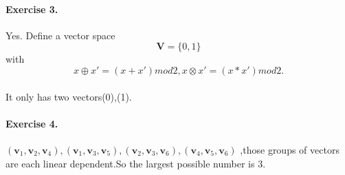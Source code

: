 \documentclass{article}
\begin{document}
  
  \paragraph{Exercise 3.} Yes.
  Define a vector space \[\mathbf{V} = \{0,1\} \] with  \[x \oplus x'=(x+x')mod 2, x \otimes x'=(x*x') mod 2.\] \\
  It only has two vectors{(0),(1)}.

  \paragraph{Exercise 4.} 
  $(\mathbf{v}_1,\mathbf{v}_2,\mathbf{v}_4),(\mathbf{v}_1,\mathbf{v}_3,\mathbf{v}_5),(\mathbf{v}_2,\mathbf{v}_3,\mathbf{v}_6),(\mathbf{v}_4,\mathbf{v}_5,\mathbf{v}_6)$ ,those groups of vectors are each linear dependent.So the largest possible number is 3.
\end{document}
